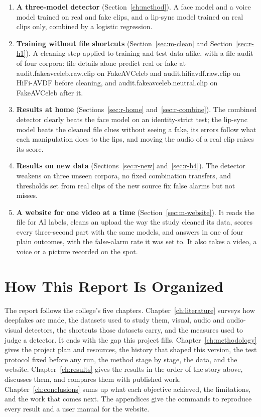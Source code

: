 \begin{enumerate}
    \item \textbf{A three-model detector} (Section~\ref{ch:method}). A face
    model and a voice model trained on real and fake clips, and a lip-sync
    model trained on real clips only, combined by a logistic regression.
    \item \textbf{Training without file shortcuts} (Section~\ref{sec:m-clean}
    and Section~\ref{sec:r-h1}). A cleaning step applied to training and test
    data alike, with a file audit of four corpora: file details alone predict
    real or fake at {{audit.fakeavceleb.raw.clip}} on FakeAVCeleb and
    {{audit.hifiavdf.raw.clip}} on HiFi-AVDF before cleaning, and
    {{audit.fakeavceleb.neutral.clip}} on FakeAVCeleb after it.
    \item \textbf{Results at home} (Sections~\ref{sec:r-home}
    and~\ref{sec:r-combine}). The combined detector clearly beats the face
    model on an identity-strict test; the lip-sync model beats the cleaned file
    clues without seeing a fake, its errors follow what each manipulation does
    to the lips, and moving the audio of a real clip raises its score.
    \item \textbf{Results on new data} (Sections~\ref{sec:r-new}
    and~\ref{sec:r-h4}). The detector weakens on three unseen corpora, no fixed
    combination transfers, and thresholds set from real clips of the new source
    fix false alarms but not misses.
    \item \textbf{A website for one video at a time}
    (Section~\ref{sec:m-website}). It reads the file for AI labels, cleans
    an upload the way the study cleaned its data, scores every three-second
    part with the same models, and answers in one of four plain outcomes, with
    the false-alarm rate it was set to. It also takes a video, a voice or a
    picture recorded on the spot.
\end{enumerate}

\section{How This Report Is Organized}

The report follows the college's five chapters.
Chapter~\ref{ch:literature} surveys how deepfakes are made, the datasets used
to study them, visual, audio and audio-visual detectors, the shortcuts those
datasets carry, and the measures used to judge a detector. It ends with the
gap this project fills. Chapter~\ref{ch:methodology} gives the project plan
and resources, the history that shaped this version, the test protocol fixed
before any run, the method stage by stage, the data, and the website.
Chapter~\ref{ch:results} gives the results in the order of the story above,
discusses them, and compares them with published work.
Chapter~\ref{ch:conclusions} sums up what each objective achieved, the
limitations, and the work that comes next. The appendices give the commands to
reproduce every result and a user manual for the website.

